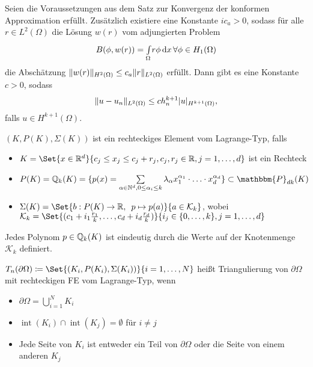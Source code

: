 \documentclass{cheat-sheet}
\newcommand{\bOmega}{\partial \Omega} %
\DeclareMathOperator{\inte}{int} %
\newcommand{\Poly}{\mathbbm{P}} %
\begin{document}

\begin{kor}
  Seien die Voraussetzungen aus dem Satz zur Konvergenz der konformen Approximation erfüllt.
  Zusätzlich existiere eine Konstante $ic_a > 0$, sodass für alle $r \in L^2(\Omega)$ die Lösung $w(r)$ vom adjungierten Problem
  \[
    B(\phi, w(r)) = {\textstyle \int\limits_{\Omega}^{}} r \phi \,\mathrm{d} x \,
    \forall \phi \in H_1(\Omega)
  \]
  die Abschätzung $\lVert w(r)\rVert_{H^2(\Omega)} \leq c_a \lVert r\rVert_{L^2(\Omega)}$ erfüllt.
  Dann gibt es eine Konstante $c > 0$, sodass
  \[
    \lVert u - u_n\rVert_{L^2(\Omega)} \leq c h^{k+1}_n \lvert u\rvert_{H^{k+1}(\Omega)},
  \]
  falls $u \in H^{k+1}(\Omega)$.
\end{kor}



\begin{defn}
  $(K, P(K), \Sigma(K))$ ist ein rechteckiges Element vom Lagrange-Typ, falls
  \begin{itemize}
    \item $K = \Set{x \in \R^d}{c_j \leq x_j \leq c_j + r_j, c_j, r_j \in \R, j = 1, \ldots, d}$ ist ein Rechteck
    \item $P(K) = \Q_k(K) = \{ p(x) = \sum_{\alpha \in \N^d, 0 \leq \alpha_i \leq k} \lambda_\alpha x_1^{\alpha_1} \cdot \ldots \cdot x_d^{\alpha_d} \} \subset \Poly_{dk}(K)$
    \item $\Sigma(K) = \Set{b : P(K) \to \R, \enspace p \mapsto p(a)}{a \in \mathcal{K}_k}$, wobei $\mathcal{K}_k = \Set{(c_1 + i_1 \tfrac{r_1}{k}, \ldots, c_d + i_d \tfrac{r_d}{k})}{i_j \in \{ 0, \ldots, k \}, j = 1, \ldots, d}$
  \end{itemize}
\end{defn}


\begin{satz}
  Jedes Polynom $p \in \mathbb{Q}_k(K)$ ist eindeutig durch die Werte auf der Knotenmenge $\mathcal{K}_k$ definiert.
\end{satz}

\begin{defn}
  $T_n(\bOmega) \coloneqq \Set{(K_i, P(K_i), \Sigma(K_i))}{i = 1, \ldots, N}$ heißt Triangulierung von $\bOmega$ mit rechteckigen FE vom Lagrange-Typ, wenn
  \begin{itemize}
    \item $\bOmega = \bigcup_{i=1}^N K_i$
    \item $\inte(K_i) \cap \inte(K_j) = \emptyset$ für $i \neq j$
    \item Jede Seite von $K_i$ ist entweder ein Teil von $\partial \Omega$ oder die Seite von einem anderen $K_j$
  \end{itemize}
\end{defn}
\end{document}
